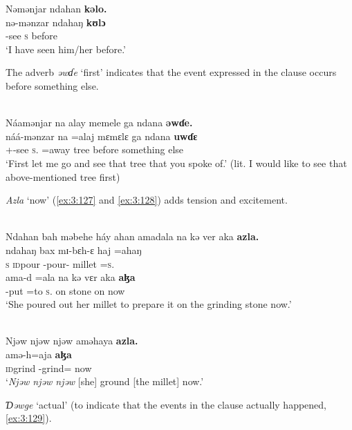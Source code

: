 \ea \label{ex:3:125}
Nəmənjar  ndahan  \textbf{kəlo.}\\
\gll  nə-mənzar    ndahaŋ  \textbf{kʊlɔ}\\
      {\oneS}-see  \textsc{s}  before\\
\glt  ‘I have seen him/her before.’
\z

The adverb \textit{əwɗe} ‘first’  indicates that the event expressed in the clause occurs before something else. 

\ea \label{ex:3:126}\\
Náamənjar  na  alay  memele  ga  ndana \textbf{  əwɗe.}\\
\gll náá-mənzar    na   =alaj    mɛmɛlɛ  ga  ndana  \textbf{uwɗɛ}\\
      {\oneS}+{\POT}-see \textsc{s}.{\DO}   =away    tree  {\ADJ}  {\DEM}  {before something else}\\
\glt  ‘First let me go and see that tree that you spoke of.’ (lit. I would like to see that above-mentioned tree first)
\z

\textit{Azla} ‘now’ (\ref{ex:3:127} and \ref{ex:3:128}) adds tension and excitement.

\ea \label{ex:3:127}\\
Ndahan  bah  məbehe  háy  ahan  amadala  na  kə  ver  aka  \textbf{azla.}\\
\gll  ndahaŋ  bax      mɪ-bɛh-ɛ    haj     =ahaŋ\\
      \textsc{s}              \textsc{id}pour  {\NOM}{}-pour-{\CL}  millet    =\textsc{s}.{\POSS}\\
\medskip
\gll  ama-d  =ala  na        kə     vɛr         aka  \textbf{aɮa}\\
      {\DEP}-put  =to    \textsc{s}.{\DO}  on  stone     on     now\\
\glt  ‘She poured out her millet to prepare it on the grinding stone now.’
\z

\ea \label{ex:3:128}\\
Njəw  njəw  njəw  aməhaya  \textbf{azla.}\\
   amə-h=aja  \textbf{aɮa}\\
      \textsc{id}grind    {\DEP}-grind={\PLU}  now\\
\glt  ‘\textit{Njəw  njəw  njəw} [she] ground [the millet] now.’
\z

\textit{Ɗəwge} ‘actual’ (to indicate that the events in the clause actually happened, \ref{ex:3:129}).


